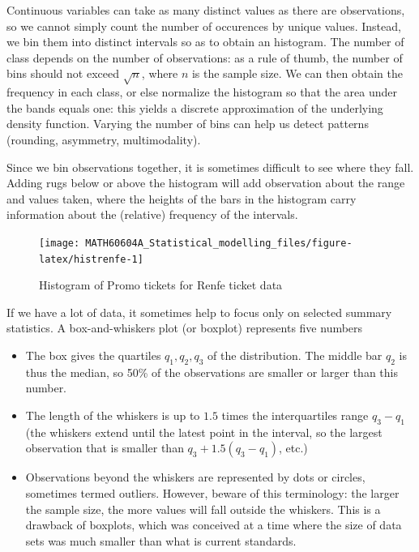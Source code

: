 \documentclass[
  11pt,
  letterpaper,
]{book}
\providecommand{\tightlist}{%
  \setlength{\itemsep}{0pt}\setlength{\parskip}{0pt}}
\theoremstyle{definition}
\theoremstyle{definition}
\theoremstyle{definition}
\theoremstyle{definition}
\theoremstyle{remark}
\begin{document}
Continuous variables can take as many distinct values as there are observations, so we cannot simply count the number of occurences by unique values. Instead, we bin them into distinct intervals so as to obtain an histogram. The number of class depends on the number of observations: as a rule of thumb, the number of bins should not exceed \(\sqrt{n}\), where \(n\) is the sample size. We can then obtain the frequency in each class, or else normalize the histogram so that the area under the bands equals one: this yields a discrete approximation of the underlying density function. Varying the number of bins can help us detect patterns (rounding, asymmetry, multimodality).

Since we bin observations together, it is sometimes difficult to see where they fall. Adding rugs below or above the histogram will add observation about the range and values taken, where the heights of the bars in the histogram carry information about the (relative) frequency of the intervals.

\begin{figure}

{\centering \texttt{[image: MATH60604A\_Statistical\_modelling\_files/figure-latex/histrenfe-1]} 

}

\caption{Histogram of Promo tickets for Renfe ticket data}\label{fig:histrenfe}
\end{figure}

If we have a lot of data, it sometimes help to focus only on selected summary statistics. A box-and-whiskers plot (or boxplot) represents five numbers

\begin{itemize}
\tightlist
\item
  The box gives the quartiles \(q_1, q_2, q_3\) of the distribution. The middle bar \(q_2\) is thus the median, so 50\% of the observations are smaller or larger than this number.
\item
  The length of the whiskers is up to \(1.5\) times the interquartiles range \(q_3-q_1\) (the whiskers extend until the latest point in the interval, so the largest observation that is smaller than \(q_3+1.5(q_3-q_1)\), etc.)
\item
  Observations beyond the whiskers are represented by dots or circles, sometimes termed outliers. However, beware of this terminology: the larger the sample size, the more values will fall outside the whiskers. This is a drawback of boxplots, which was conceived at a time where the size of data sets was much smaller than what is current standards.
\end{itemize}
\end{document}
